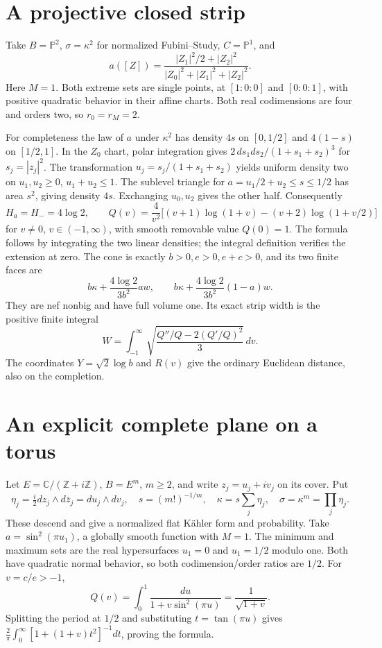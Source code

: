 \documentclass[11pt]{article}
\theoremstyle{remark}\newtheorem{remark}[theorem]{Remark}
\begin{document}
\section{A projective closed strip}
Take $B=\mathbb P^2$, $\sigma=\kappa^2$ for normalized Fubini--Study,
$C=\mathbb P^1$, and
\[
 a([Z])=\frac{|Z_1|^2/2+|Z_2|^2}{|Z_0|^2+|Z_1|^2+|Z_2|^2}.
\]
Here $M=1$. Both extreme sets are single points, at $[1:0:0]$ and
$[0:0:1]$, with positive quadratic behavior in their affine charts.
Both real codimensions are four and orders two, so $r_0=r_M=2$.

For completeness the law of $a$ under $\kappa^2$ has density $4s$ on
$[0,1/2]$ and $4(1-s)$ on $[1/2,1]$. In the $Z_0$ chart, polar
integration gives $2\,ds_1ds_2/(1+s_1+s_2)^3$ for $s_j=|z_j|^2$.
The transformation $u_j=s_j/(1+s_1+s_2)$ yields uniform density two
on $u_1,u_2\geq0$, $u_1+u_2\leq1$. The sublevel triangle for
$a=u_1/2+u_2\leq s\leq1/2$ has area $s^2$, giving density $4s$.
Exchanging $u_0,u_2$ gives the other half. Consequently
\[
 H_a=H_-=4\log2,\qquad
 Q(v)=\frac4{v^2}\big[(v+1)\log(1+v)-(v+2)\log(1+v/2)\big]
\]
for $v\ne0$, $v\in(-1,\infty)$, with smooth removable value $Q(0)=1$.
The formula follows by integrating the two linear densities; the integral
definition verifies the extension at zero. The cone is exactly
$b>0,e>0,e+c>0$, and its two finite faces are
\[
 b\kappa+\frac{4\log2}{3b^2}a w,
 \qquad b\kappa+\frac{4\log2}{3b^2}(1-a)w.
\]
They are nef nonbig and have full volume one. Its exact strip width is
the positive finite integral
\[
 W=\int_{-1}^{\infty}
 \sqrt{\frac{Q''/Q-2(Q'/Q)^2}{3}}\,dv.
\]
The coordinates $Y=\sqrt2\log b$ and $R(v)$ give the ordinary Euclidean
distance, also on the completion.

\section{An explicit complete plane on a torus}
Let $E=\mathbb C/(\mathbb Z+i\mathbb Z)$, $B=E^m$, $m\geq2$,
and write $z_j=u_j+i v_j$ on its cover. Put
\[
 \eta_j=\tfrac i2 dz_j\wedge d\bar z_j=du_j\wedge dv_j,
 \quad s=(m!)^{-1/m},\quad\kappa=s\sum_j\eta_j,
 \quad\sigma=\kappa^m=\prod_j\eta_j.
\]
These descend and give a normalized flat K\"ahler form and probability.
Take $a=\sin^2(\pi u_1)$, a globally smooth function with $M=1$.
The minimum and maximum sets are the real hypersurfaces $u_1=0$ and
$u_1=1/2$ modulo one. Both have quadratic normal behavior, so both
codimension/order ratios are $1/2$. For $v=c/e>-1$,
\[
 Q(v)=\int_0^1\frac{du}{1+v\sin^2(\pi u)}=\frac1{\sqrt{1+v}}.
\]
Splitting the period at $1/2$ and substituting $t=\tan(\pi u)$ gives
$\frac2\pi\int_0^\infty[1+(1+v)t^2]^{-1}dt$, proving the formula.
\end{document}
